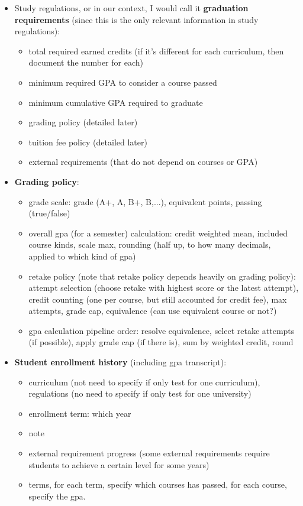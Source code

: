 \documentclass[10pt,a4paper]{article}
\begin{document}
\begin{itemize}
\begin{itemize}
        \item Study regulations, or in our context, I would call it \textbf{graduation requirements }(since this is the only relevant information in study regulations):
        \begin{itemize}
            \item total required earned credits (if it's different for each curriculum, then document the number for each)
            \item minimum required GPA to consider a course passed
            \item minimum cumulative GPA required to graduate
            \item grading policy (detailed later)
            \item tuition fee policy (detailed later)
            \item external requirements (that do not depend on courses or GPA)
        \end{itemize}

        \item \textbf{Grading policy}:  
        \begin{itemize}
            \item grade scale: grade (A+, A, B+, B,...), equivalent points, passing (true/false)
            \item overall gpa (for a semester) calculation: credit weighted mean, included course kinds, scale max, rounding (half up, to how many decimals, applied to which kind of gpa)
            \item retake policy (note that retake policy depends heavily on grading policy): attempt selection (choose retake with highest score or the latest attempt), credit counting (one per course, but still accounted for credit  fee), max attempts, grade cap, equivalence (can use equivalent course or not?)
            \item gpa calculation pipeline order: resolve equivalence, select retake attempts (if possible), apply grade cap (if there is), sum by weighted credit, round 
        \end{itemize}

        \item \textbf{Student enrollment history} (including gpa transcript):
        \begin{itemize}
            \item curriculum (not need to specify if only test for one curriculum), regulations (no need to specify if only test for one university)
            \item enrollment term: which year
            \item note
            \item external requirement progress (some external requirements require students to achieve a certain level for some years)
            \item terms, for each term, specify which courses has passed, for each course, specify the gpa. 
        \end{itemize}
        
    \end{itemize}
\end{itemize}
\end{document}
